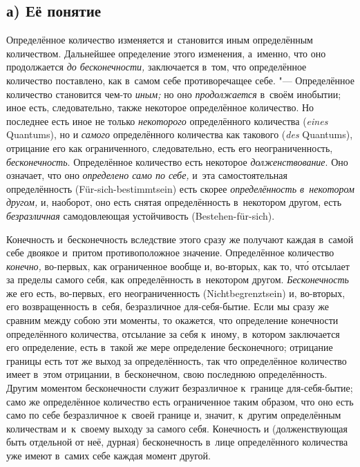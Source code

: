 
\subsection[а) Её понятие]{а) Её понятие}

Определённое количество изменяется и~становится иным определённым
количеством. Дальнейшее определение этого изменения, а~именно, что оно
продолжается {\em до бесконечности,} заключается в~том, что определённое
количество поставлено, как в~самом себе противоречащее себе. "--- Определённое
количество становится чем-то {\em иным;} но оно {\em продолжается} в~своём
инобытии; иное есть, следовательно, также некоторое определённое количество.
Но последнее есть иное не только {\em некоторого} определённого количества ({\em \!eines} Quantums),
но и {\em самого} определённого количества как такового ({\em \!des} Quantums), отрицание его как
ограниченного, следовательно, есть его неограниченность, {\em бесконечность}.
Определённое количество есть некоторое {\em долженствование}. Оно означает, что
оно {\em определено само по себе,} и~эта самостоятельная определённость
(Für-sich-bestimmt\-sein) есть скорее {\em определённость в~некотором другом,} и,
наоборот, оно есть снятая определённость в~некотором другом, есть
{\em безразличная} самодовлеющая устойчивость (Bestehen-für-sich).

Конечность и~бесконечность вследствие этого сразу же получают каждая в~самой
себе двоякое и~притом противоположное значение. Определённое количество
{\em конечно,} во-первых, как ограниченное вообще и, во-вторых, как то, чт\'{о}
отсылает за пределы самого себя, как определённость в~некотором другом.
{\em Бесконечность} же его есть, во-первых, его неограниченность (Nicht\-begrenzt\-sein) и, во-вторых,
его возвращенность в~себя, безразличное для-себя-бытие. Если мы сразу же
сравним между собою эти моменты, то окажется, что определение конечности
определённого количества, отсылание за себя к~иному, в~котором заключается его
определение, есть в~такой же мере определение бесконечного; отрицание границы
есть тот же выход за определённость, так что определённое количество имеет
в~этом отрицании, в~бесконечном, свою последнюю определённость. Другим моментом
бесконечности служит безразличное к~границе для-себя-бытие; само же
определённое количество есть ограниченное таким образом, что оно есть само по
себе безразличное к~своей границе и, значит, к~другим определённым количествам
и~к~своему выходу за самого себя. Конечность и (долженствующая быть отдельной
от неё, дурная) бесконечность в~лице определённого количества уже имеют в~самих
себе каждая момент другой.

